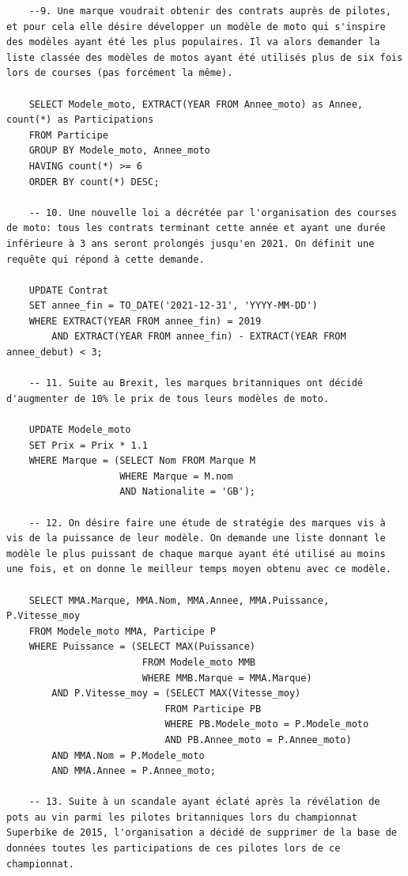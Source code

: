 \documentclass[12pt,a4paper]{article}
\newenvironment{code}{\captionsetup{type=listing}}{}
\begin{document}
\begin{code}
\begin{verbatim}
    --9. Une marque voudrait obtenir des contrats auprès de pilotes, et pour cela elle désire développer un modèle de moto qui s'inspire des modèles ayant été les plus populaires. Il va alors demander la liste classée des modèles de motos ayant été utilisés plus de six fois lors de courses (pas forcément la même).

    SELECT Modele_moto, EXTRACT(YEAR FROM Annee_moto) as Annee, count(*) as Participations
    FROM Participe
    GROUP BY Modele_moto, Annee_moto
    HAVING count(*) >= 6
    ORDER BY count(*) DESC;
    
    -- 10. Une nouvelle loi a décrétée par l'organisation des courses de moto: tous les contrats terminant cette année et ayant une durée inférieure à 3 ans seront prolongés jusqu'en 2021. On définit une requête qui répond à cette demande.
    
    UPDATE Contrat 
    SET annee_fin = TO_DATE('2021-12-31', 'YYYY-MM-DD')
    WHERE EXTRACT(YEAR FROM annee_fin) = 2019
        AND EXTRACT(YEAR FROM annee_fin) - EXTRACT(YEAR FROM annee_debut) < 3;
        
    -- 11. Suite au Brexit, les marques britanniques ont décidé d'augmenter de 10% le prix de tous leurs modèles de moto.

    UPDATE Modele_moto
    SET Prix = Prix * 1.1
    WHERE Marque = (SELECT Nom FROM Marque M 
                    WHERE Marque = M.nom
                    AND Nationalite = 'GB');

    -- 12. On désire faire une étude de stratégie des marques vis à vis de la puissance de leur modèle. On demande une liste donnant le modèle le plus puissant de chaque marque ayant été utilisé au moins une fois, et on donne le meilleur temps moyen obtenu avec ce modèle.

    SELECT MMA.Marque, MMA.Nom, MMA.Annee, MMA.Puissance, P.Vitesse_moy
    FROM Modele_moto MMA, Participe P
    WHERE Puissance = (SELECT MAX(Puissance) 
                        FROM Modele_moto MMB 
                        WHERE MMB.Marque = MMA.Marque)
        AND P.Vitesse_moy = (SELECT MAX(Vitesse_moy)
                            FROM Participe PB 
                            WHERE PB.Modele_moto = P.Modele_moto
                            AND PB.Annee_moto = P.Annee_moto)
        AND MMA.Nom = P.Modele_moto
        AND MMA.Annee = P.Annee_moto;
    
    -- 13. Suite à un scandale ayant éclaté après la révélation de pots au vin parmi les pilotes britanniques lors du championnat Superbike de 2015, l'organisation a décidé de supprimer de la base de données toutes les participations de ces pilotes lors de ce championnat.


\end{verbatim}
\end{code}
\end{document}
